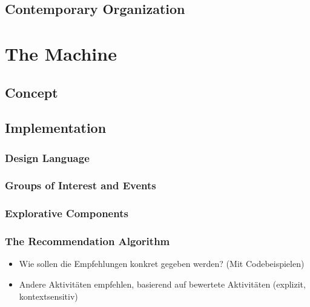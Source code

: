 \documentclass[12pt,numbers=noenddot,parskip,bibliography=totocnumbered,listof=totocnumbered]{scrreprt}
\begin{document}
\section{Contemporary Organization}

\chapter{The Machine}

\section{Concept}
\section{Implementation}

\subsection{Design Language}

\subsection{Groups of Interest and Events}

\subsection{Explorative Components}

\subsection{The Recommendation Algorithm}
\begin{itemize} 
	\item Wie sollen die Empfehlungen konkret gegeben werden? (Mit Codebeispielen)
	\item Andere Aktivitäten empfehlen, basierend auf bewertete Aktivitäten (explizit, kontextsensitiv)
\end{itemize} 
	
\end{document}
